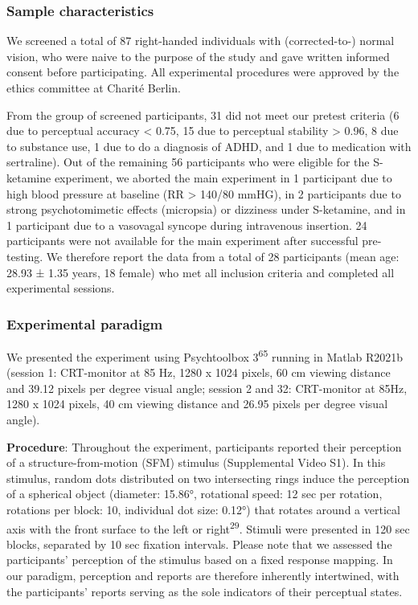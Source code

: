 \documentclass[
]{article}
\begin{document}
\subsubsection{Sample characteristics}\label{sample-characteristics}

We screened a total of 87 right-handed individuals with (corrected-to-)
normal vision, who were naive to the purpose of the study and gave
written informed consent before participating. All experimental
procedures were approved by the ethics committee at Charité Berlin.

From the group of screened participants, 31 did not meet our pretest
criteria (6 due to perceptual accuracy \textless{} 0.75, 15 due to
perceptual stability \textgreater{} 0.96, 8 due to substance use, 1 due
to do a diagnosis of ADHD, and 1 due to medication with sertraline). Out
of the remaining 56 participants who were eligible for the S-ketamine
experiment, we aborted the main experiment in 1 participant due to high
blood pressure at baseline (RR \textgreater{} 140/80 mmHG), in 2
participants due to strong psychotomimetic effects (micropsia) or
dizziness under S-ketamine, and in 1 participant due to a vasovagal
syncope during intravenous insertion. 24 participants were not available
for the main experiment after successful pre-testing. We therefore
report the data from a total of 28 participants (mean age: 28.93 ± 1.35
years, 18 female) who met all inclusion criteria and completed all
experimental sessions.

\subsubsection{Experimental paradigm}\label{experimental-paradigm}

We presented the experiment using Psychtoolbox 3\textsuperscript{65}
running in Matlab R2021b (session 1: CRT-monitor at 85 Hz, 1280 x 1024
pixels, 60 cm viewing distance and 39.12 pixels per degree visual angle;
session 2 and 32: CRT-monitor at 85Hz, 1280 x 1024 pixels, 40 cm viewing
distance and 26.95 pixels per degree visual angle).

\textbf{Procedure}: Throughout the experiment, participants reported
their perception of a structure-from-motion (SFM) stimulus (Supplemental
Video S1). In this stimulus, random dots distributed on two intersecting
rings induce the perception of a spherical object (diameter: 15.86°,
rotational speed: 12 sec per rotation, rotations per block: 10,
individual dot size: 0.12°) that rotates around a vertical axis with the
front surface to the left or right\textsuperscript{29}. Stimuli were
presented in 120 sec blocks, separated by 10 sec fixation intervals.
Please note that we assessed the participants' perception of the
stimulus based on a fixed response mapping. In our paradigm, perception
and reports are therefore inherently intertwined, with the participants'
reports serving as the sole indicators of their perceptual states.
\end{document}

